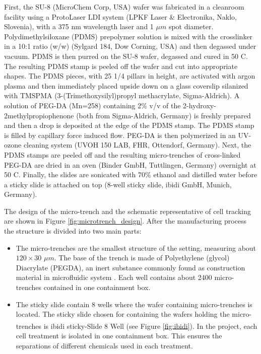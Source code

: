 \documentclass[pdftex,12pt,a4paper]{report}
\begin{document}
First, the SU-8 (MicroChem Corp, USA) wafer was fabricated in a cleanroom facility using a ProtoLaser LDI system (LPKF Laser \& Electronika, Naklo, Slovenia), with a 375 nm wavelength laser and 1 $\mu m$ spot diameter.
Polydimethylsiloxane (PDMS) prepolymer solution is mixed with the crosslinker in a 10:1 ratio (w/w) (Sylgard 184, Dow Corning, USA) and then degassed under vacuum. PDMS is then purred on the SU-8 wafer, degassed and cured in 50 \degree C. The resulting PDMS stamp is peeled off the wafer and cut into appropriate shapes. The PDMS pieces, with 25 1/4 pillars in height, are activated with argon plasma and then immediately placed upside down on a glass coverslip  silanized with TMSPMA (3-(Trimethoxysilyl)propyl methacrylate, Sigma-Aldrich). A solution of PEG-DA (Mn=258) containing 2\% v/v of the 2-hydroxy-2methylpropiophenone (both from Sigma-Aldrich, Germany) is freshly prepared and then a drop is deposited at the edge of the PDMS stamp. The PDMS stamp is filled by capillary force induced flow. PEG-DA is then polymerized in an UV-ozone cleaning system (UVOH 150 LAB, FHR, Ottendorf, Germany). Next, the PDMS stamps are peeled off and the resulting micro-trenches of cross-linked PEG-DA are dried in an oven (Binder GmbH, Tuttlingen, Germany) overnight at 50 \degree C. Finally, the slides are sonicated with 70\% ethanol and distilled water before a sticky slide is attached on top (8-well sticky slide, ibidi GmbH, Munich, Germany).

The design of the micro-trench and the schematic representative of cell tracking are shown in Figure \ref{fig:microtrench_design}. After the manufacturing process the structure is divided into two main parts:

\begin{itemize}
\item The micro-trenches are the smallest structure of the setting, measuring about $120 \times 30$ $\mu m$. The base of the trench is made of Polyethylene (glycol) Diacrylate (PEGDA), an inert substance commonly found as construction material in microfluidic system \cite{sekhavati2015marker}. Each well contains about 2400 micro-trenches contained in one containment box.

\item The sticky slide contain 8 wells where the wafer containing micro-trenches is located. The sticky slide chosen for containing the wafers holding the micro-trenches is ibidi\textsuperscript{\textregistered} sticky-Slide 8 Well (see Figure \ref{fig:ibidi}). In the project, each cell treatment is isolated in one containment box. This ensures
 the separations of different chemicals used in each treatment.

\end{itemize}
\end{document}
